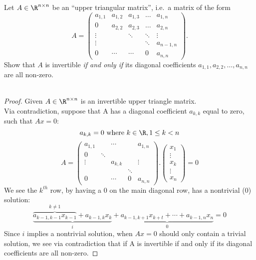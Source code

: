 \documentclass[11pt,nocut]{article}
\begin{document}
\vspace{1mm}

\begin{problem}[3 points]
	Let $A \in \R^{n \times n}$ be an ``upper triangular matrix'', i.e.\ a matrix of the form
	$$
	A=
	\begin{pmatrix}
		a_{1,1}&a_{1,2}&a_{1,3}&\ldots& a_{1,n}\\
		0 & a_{2,2}&a_{2,3}&\ldots& a_{2,n}\\
			   \vdots & &\ddots &\ddots &\vdots \\
			   \vdots & & & \ddots & a_{n-1,n}\\
		0& \cdots& \cdots & 0 &a_{n,n}
	\end{pmatrix}.
	$$
	Show that $A$ is invertible \emph{if and only if} its diagonal coefficients $a_{1,1}, a_{2,2}, \dots, a_{n,n}$ are all non-zero.\\ \\
	\begin{proof}
	Given $A \in \R^{n \times n}$ is an invertible upper triangle matrix. \\
	Via contradiction, suppose that A has a diagonal coefficient $a_{k,k}$ equal to zero, such that $Ax = 0$:
	$$
	a_{k,k} = 0 \mbox{ where } k \in \R, 1 \leq k < n
	$$
	$$
		A=
	\begin{pmatrix}
		a_{1,1}	& 		& \cdots	& 		& a_{1,n}\\
		0 		& \ddots	& 		& 		& \\
		\vdots 	& 		& a_{k,k} 	& 		&\vdots \\
		 		& 		& 		& \ddots 	& \\
		0		& 		& \cdots 	& 0 		&a_{n,n}
	\end{pmatrix}.
	\begin{pmatrix}
		x_1\\
		\vdots \\
		x_k\\
		\vdots \\
		x_n
	\end{pmatrix} = 0
	$$
	We see the $k^{th}$ row, by having a 0 on the main diagonal row, has a nontrivial (0) solution:
	$$
	\underbrace {\overbrace {a_{k-1,k-1}x_{k-1}}^{k \neq 1}+a_{k-1,k}x_k}_{i} + \underbrace {a_{k-1,k+1}x_{k+t} + \cdots + a_{k-1,n}x_n}_{0} = 0
	$$
	Since $i$ implies a nontrivial solution, when $Ax = 0$ should only contain a trivial solution, we see via contradiction that if A is invertible if and only if its diagonal coefficients are all non-zero. 
	\end{proof}
\end{problem}
\end{document}
